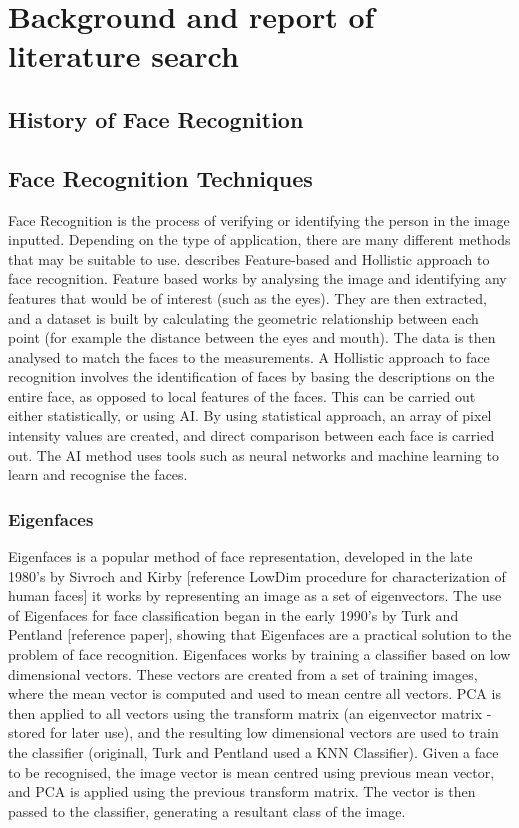 \documentclass[12pt, a4paper]{article}
\begin{document}
\newpage
\section{Background and report of literature search}
\subsection{History of Face Recognition}

\subsection{Face Recognition Techniques}
Face Recognition is the process of verifying or identifying the person in the image inputted. Depending on the type of application, there are many different methods that may be suitable to use. \cite{facesurvey} describes Feature-based and Hollistic approach to face recognition. Feature based works by analysing the image and identifying any features that would be of interest (such as the eyes). They are then extracted, and a dataset is built by calculating the geometric relationship between each point (for example the distance between the eyes and mouth). The data is then analysed to match the faces to the measurements. A Hollistic approach to face recognition involves the identification of faces by basing the descriptions on the entire face, as opposed to local features of the faces. This can be carried out either statistically, or using AI. By using statistical approach, an array of pixel intensity values are created, and direct comparison between each face is carried out. The AI method uses tools such as neural networks and machine learning to learn and recognise the faces.
\subsubsection{Eigenfaces}
Eigenfaces is a popular method of face representation, developed in the late 1980's by Sivroch and Kirby [reference LowDim procedure for characterization of human faces] it works by representing an image as a set of eigenvectors. The use of Eigenfaces for face classification began in the early 1990's by Turk and Pentland [reference paper], showing that Eigenfaces are a practical solution to the problem of face recognition. Eigenfaces works by training a classifier based on low dimensional vectors. These vectors are created from a set of training images, where the mean vector is computed and used to mean centre all vectors. PCA is then applied to all vectors using the transform matrix (an eigenvector matrix - stored for later use), and the resulting low dimensional vectors are used to train the classifier (originall, Turk and Pentland used a KNN Classifier). Given a face to be recognised, the image vector is mean centred using previous mean vector, and PCA is applied using the previous transform matrix. The vector is then passed to the classifier, generating a resultant class of the image.
\end{document}
